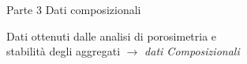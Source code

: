 \documentclass[10pt]{beamer}
\begin{document}
\begin{frame}{Parte 3 \small{Dati composizionali}}
\begin{center}
  Dati ottenuti dalle analisi di porosimetria e\\
  stabilità degli aggregati $\rightarrow$ \emph{dati
    Composizionali}%
\end{center}

\vfill
\end{frame}
\end{document}

